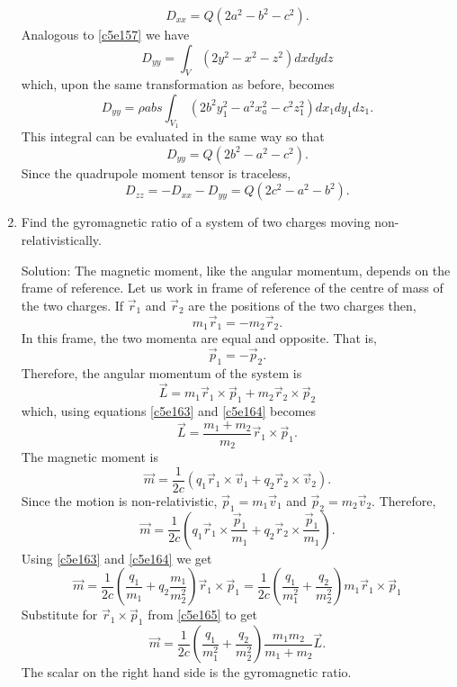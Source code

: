 \begin{enumerate}
\begin{equation}
D_{xx} = Q(2a^2-b^2-c^2).
\end{equation}
Analogous to \eqref{c5e157} we have
\begin{equation}\label{c5e160}
D_{yy} = \int_V(2y^2 - x^2 - z^2)dxdydz
\end{equation}
which, upon the same transformation as before, becomes
\[
D_{yy} = \rho abs\int_{V_1}(2b^2y_1^2 - a^2x_a^2 - c^2z_1^2)dx_1dy_1dz_1.
\]
This integral can be evaluated in the same way so that
\begin{equation}\label{c5e161}
D_{yy} = Q(2b^2 - a^2 - c^2).
\end{equation}
Since the quadrupole moment tensor is traceless,
\begin{equation}\label{c5e162}
D_{zz} = -D_{xx} - D_{yy} = Q(2c^2 - a^2 - b^2).
\end{equation}

\item Find the gyromagnetic ratio of a system of two charges moving non-
relativistically.
\item[Solution:] The magnetic moment, like the angular momentum, depends on the
frame of reference. Let us work in frame of reference of the centre of mass of 
the two charges. If $\vec{r}_1$ and $\vec{r}_2$ are the positions of the two
charges then,
\begin{equation}\label{c5e163}
m_1\vec{r}_1 = -m_2\vec{r}_2.
\end{equation}
In this frame, the two momenta are equal and opposite. That is,
\begin{equation}\label{c5e164}
\vec{p}_1 = -\vec{p}_2.
\end{equation}
Therefore, the angular momentum of the system is
\[
\vec{L} = m_1\vec{r}_1\times\vec{p}_1 + m_2\vec{r}_2\times\vec{p}_2 
\]
which, using equations \eqref{c5e163} and \eqref{c5e164} becomes
\begin{equation}\label{c5e165}
\vec{L} = \frac{m_1 + m_2}{m_2}\vec{r}_1 \times \vec{p}_1.
\end{equation}
The magnetic moment is
\[
\vec{m} = \frac{1}{2c}(q_1\vec{r}_1\times\vec{v}_1 + 
q_2\vec{r}_2\times\vec{v}_2).
\]
Since the motion is non-relativistic, $\vec{p}_1 = m_1\vec{v}_1$ and $\vec{p}_2
= m_2\vec{v}_2$. Therefore,
\[
\vec{m} = \frac{1}{2c}\left(q_1\vec{r}_1\times\frac{\vec{p}_1}{m_1} + 
q_2\vec{r}_2\times\frac{\vec{p}_1}{m_1}\right).
\]
Using \eqref{c5e163} and \eqref{c5e164} we get
\[
\vec{m} = \frac{1}{2c}\left(\frac{q_1}{m_1} + 
 q_2\frac{m_1}{m_2^2}\right)\vec{r}_1\times\vec{p}_1
= \frac{1}{2c}\left(\frac{q_1}{m_1^2} + 
\frac{q_2}{m_2^2}\right)m_1\vec{r}_1\times\vec{p}_1
\]
Substitute for $\vec{r}_1 \times \vec{p}_1$ from \eqref{c5e165} to get
\begin{equation}\label{c5e166}
\vec{m} = \frac{1}{2c}\left(\frac{q_1}{m_1^2} + 
\frac{q_2}{m_2^2}\right)\frac{m_1m_2}{m_1+m_2}\vec{L}.
\end{equation}
The scalar on the right hand side is the gyromagnetic ratio.
\end{enumerate}

